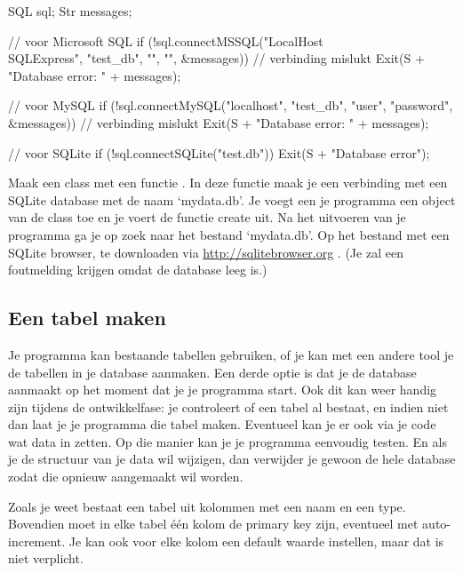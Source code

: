\begin{code}
SQL sql;
Str messages;

// voor Microsoft SQL
if (!sql.connectMSSQL("LocalHost\\SQLExpress", "test_db", "", "", &messages)) {
  // verbinding mislukt
	Exit(S + "Database error: " + messages);
}

// voor MySQL
if (!sql.connectMySQL("localhost", "test_db", "user", "password", &messages)) {
  // verbinding mislukt
	Exit(S + "Database error: " + messages);
}

// voor SQLite
if (!sql.connectSQLite("test.db")) {
  Exit(S + "Database error");
}
\end{code}

\begin{exercise}
Maak een class  met een functie . In deze functie maak je een verbinding met een SQLite database met de naam `mydata.db'. Je voegt een je programma een object van de class toe en je voert de functie create uit. Na het uitvoeren van je programma ga je op zoek naar het bestand `mydata.db'. Op het bestand met een SQLite browser, te downloaden via \url{http://sqlitebrowser.org} . (Je zal een foutmelding krijgen omdat de database leeg is.)
\end{exercise}

\subsection{Een tabel maken}
Je programma kan bestaande tabellen gebruiken, of je kan met een andere tool je de tabellen in je database aanmaken. Een derde optie is dat je de database aanmaakt op het moment dat je je programma start. Ook dit kan weer handig zijn tijdens de ontwikkelfase: je controleert of een tabel al bestaat, en indien niet dan laat je je programma die tabel maken. Eventueel kan je er ook via je code wat data in zetten. Op die manier kan je je programma eenvoudig testen. En als je de structuur van je data wil wijzigen, dan verwijder je gewoon de hele database zodat die opnieuw aangemaakt wil worden.

Zoals je weet bestaat een tabel uit kolommen met een naam en een type. Bovendien moet in elke tabel \'e\'en kolom de primary key zijn, eventueel met auto-increment. Je kan ook voor elke kolom een default waarde instellen, maar dat is niet verplicht.

